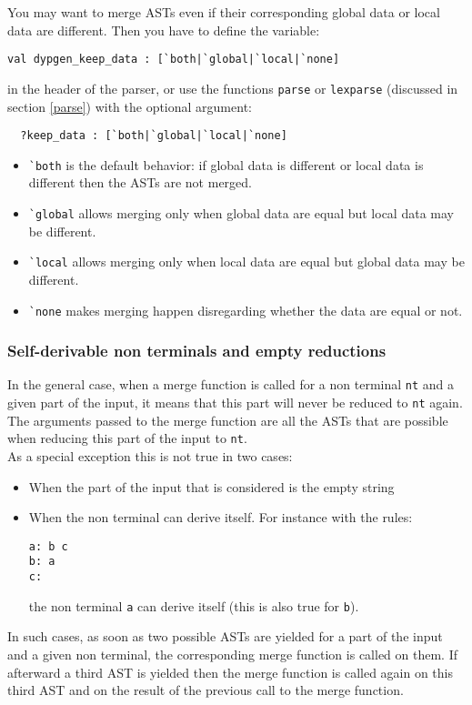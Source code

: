 \documentclass[12pt]{article}
\begin{document}
{You may want to merge ASTs even if their corresponding global data or local data are different. Then you have to define the variable:
\begin{verbatim}
val dypgen_keep_data : [`both|`global|`local|`none]
\end{verbatim}
in the header of the parser, or use the functions \verb|parse| or \verb|lexparse| (discussed in section \ref{parse}) with the optional argument:
\begin{verbatim}
  ?keep_data : [`both|`global|`local|`none]
\end{verbatim}
\begin{itemize}
\item\verb|`both| is the default behavior: if global data is different or local data is different then the ASTs are not merged.
\item\verb|`global| allows merging only when global data are equal but local data may be different.
\item\verb|`local| allows merging only when local data are equal but global data may be different.
\item\verb|`none| makes merging happen disregarding whether the data are equal or not.
\end{itemize}

\subsubsection{Self-derivable non terminals and empty reductions}

In the general case, when a merge function is called for a non terminal \verb|nt| and a given part of the input, it means that this part will never be reduced to \verb|nt| again. The arguments passed to the merge function are all the ASTs that are possible when reducing this part of the input to \verb|nt|.\\

As a special exception this is not true in two cases:
\begin{itemize}
\item When the part of the input that is considered is the empty string
\item When the non terminal can derive itself. For instance with the rules:
\begin{verbatim}
a: b c
b: a
c:
\end{verbatim}
the non terminal \verb|a| can derive itself (this is also true for \verb|b|).
\end{itemize}
In such cases, as soon as two possible ASTs are yielded for a part of the input and a given non terminal, the corresponding merge function is called on them. If afterward a third AST is yielded then the merge function is called again on this third AST and on the result of the previous call to the merge function.\\

}
\end{document}

